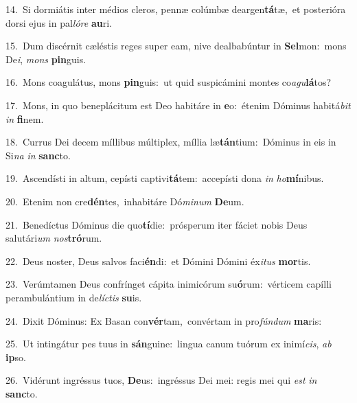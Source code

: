 {\numbfont\textcolor{\numbcolor}{14.}}~Si dormiátis inter médios cleros, pennæ colúmbæ deargen\-\textbf{tá}\-tæ,~\star et posterióra dorsi ejus in pal\-\textit{ló}\-\textit{re} \textbf{au}\-ri.\par
{\numbfont\textcolor{\numbcolor}{15.}}~Dum discérnit cæléstis reges super eam, nive dealbabúntur in \textbf{Sel}\-mon:~\star mons De\-\textit{i}\-, \textit{mons} \textbf{pin}\-guis.\par
{\numbfont\textcolor{\numbcolor}{16.}}~Mons coagulátus, mons \textbf{pin}\-guis:~\star ut quid suspicámini montes co\-\textit{a}\-\textit{gu}\textbf{lá}tos?\par
{\numbfont\textcolor{\numbcolor}{17.}}~Mons, in quo beneplácitum est Deo habitáre in \textbf{e}\-o:~\star étenim Dóminus habitá\textit{bit} \textit{in} \textbf{fi}\-nem.\par
{\numbfont\textcolor{\numbcolor}{18.}}~Currus Dei decem míllibus múltiplex, míllia læ\-\textbf{tán}\-tium:~\star Dóminus in eis in Si\textit{na} \textit{in} \textbf{sanc}\-to.\par
{\numbfont\textcolor{\numbcolor}{19.}}~Ascendísti in altum, cepísti captivi\-\textbf{tá}\-tem:~\star accepísti dona \textit{in} \textit{ho}\-\textbf{mí}nibus.\par
{\numbfont\textcolor{\numbcolor}{20.}}~Etenim non cre\-\textbf{dén}\-tes,~\star inhabitáre Dó\-\textit{mi}\-\textit{num} \textbf{De}\-um.\par
{\numbfont\textcolor{\numbcolor}{21.}}~Benedíctus Dóminus die quo\-\textbf{tí}\-die:~\star prósperum iter fáciet nobis Deus salutári\textit{um} \textit{nos}\-\textbf{tró}rum.\par
{\numbfont\textcolor{\numbcolor}{22.}}~Deus noster, Deus salvos faci\-\textbf{én}\-di:~\star et Dómini Dómini éx\-\textit{i}\-\textit{tus} \textbf{mor}\-tis.\par
{\numbfont\textcolor{\numbcolor}{23.}}~Verúmtamen Deus confrínget cápita inimicórum su\-\textbf{ó}\-rum:~\star vérticem capílli perambulántium in de\-\textit{líc}\-\textit{tis} \textbf{su}\-is.\par
{\numbfont\textcolor{\numbcolor}{24.}}~Dixit Dóminus: Ex Basan con\-\textbf{vér}\-tam,~\star convértam in pro\-\textit{fún}\-\textit{dum} \textbf{ma}\-ris:\par
{\numbfont\textcolor{\numbcolor}{25.}}~Ut intingátur pes tuus in \textbf{sán}\-guine:~\star lingua canum tuórum ex inimí\-\textit{cis}\-, \textit{ab} \textbf{ip}\-so.\par
{\numbfont\textcolor{\numbcolor}{26.}}~Vidérunt ingréssus tuos, \textbf{De}\-us:~\star ingréssus Dei mei: regis mei qui \textit{est} \textit{in} \textbf{sanc}\-to.\par
